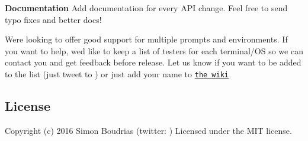 {\bfseries Documentation} Add documentation for every A\+PI change. Feel free to send typo fixes and better docs!

We\textquotesingle{}re looking to offer good support for multiple prompts and environments. If you want to help, we\textquotesingle{}d like to keep a list of testers for each terminal/\+OS so we can contact you and get feedback before release. Let us know if you want to be added to the list (just tweet to \href{https://twitter.com/Vaxilart}{\tt }) or just add your name to \href{https://github.com/SBoudrias/Inquirer.js/wiki/Testers}{\tt the wiki}

\subsection*{License}

\label{_license}%


Copyright (c) 2016 Simon Boudrias (twitter\+: \href{https://twitter.com/Vaxilart}{\tt }) Licensed under the M\+IT license. 